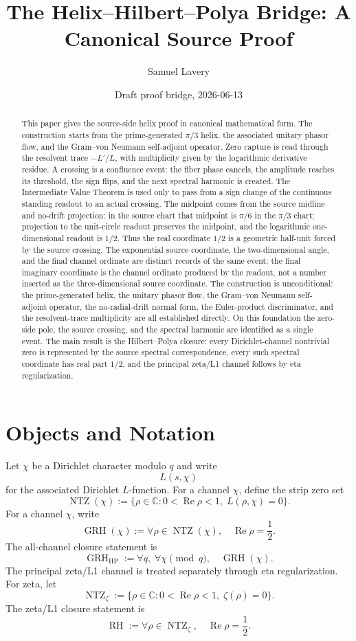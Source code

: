 \documentclass[11pt]{article}
\title{The Helix--Hilbert--Polya Bridge: A Canonical Source Proof}
\author{Samuel Lavery}
\date{Draft proof bridge, 2026-06-13}
\DeclareMathOperator{\Ree}{Re}
\DeclareMathOperator{\NTZ}{NTZ}
\DeclareMathOperator{\GRH}{GRH}
\DeclareMathOperator{\RH}{RH}
\begin{document}
\maketitle

\begin{abstract}
This paper gives the source-side helix proof in canonical mathematical form.  The
construction starts from the prime-generated $\pi/3$ helix, the associated unitary
phasor flow, and the Gram--von Neumann self-adjoint operator.  Zero capture is read
through the resolvent trace $-L'/L$, with multiplicity given by the logarithmic
derivative residue.  A crossing is a confluence event: the fiber phase cancels, the
amplitude reaches its threshold, the sign flips, and the next spectral harmonic is
created.  The Intermediate Value Theorem is used only to pass from a sign
change of the continuous standing readout to an actual crossing.  The midpoint
comes from the source midline and no-drift projection: in the source chart
that midpoint is $\pi/6$ in the $\pi/3$ chart;
projection to the unit-circle readout preserves the midpoint, and the logarithmic
one-dimensional readout is $1/2$.  Thus the real coordinate $1/2$ is a geometric
half-unit forced by the source crossing.  The exponential source coordinate,
the two-dimensional angle, and the final channel ordinate are distinct records
of the same event; the final imaginary coordinate is the channel ordinate
produced by the readout, not a number inserted as the three-dimensional source
coordinate.  The construction is
unconditional: the prime-generated helix, the unitary
phasor flow, the Gram--von Neumann self-adjoint operator, the no-radial-drift normal
form, the Euler-product discriminator, and the resolvent-trace multiplicity are all
established directly.  On this foundation the zero-side pole, the source crossing, and
the spectral harmonic are identified as a single event.  The main result is the
Hilbert--Polya closure: every Dirichlet-channel nontrivial zero is represented by the
source spectral correspondence, every such spectral coordinate has real part $1/2$,
and the principal zeta/L1 channel follows by eta regularization.
\end{abstract}

\tableofcontents

\section{Objects and Notation}

Let $\chi$ be a Dirichlet character modulo $q$ and write
\[
  L(s,\chi)
\]
for the associated Dirichlet $L$-function.  For a channel $\chi$, define the strip zero set
\[
  \NTZ(\chi)
  :=
  \{\rho\in\mathbb C : 0<\Ree\rho<1,\; L(\rho,\chi)=0\}.
\]
For a channel $\chi$, write
\[
  \GRH(\chi)
  :=
  \forall \rho\in\NTZ(\chi),\quad \Ree\rho=\frac12 .
\]
The all-channel closure statement is
\[
  \GRH_{\mathrm{HP}}
  :=
  \forall q,\;\forall\chi \pmod q,\quad \GRH(\chi).
\]
The principal zeta/L1 channel is treated separately through eta regularization.
For zeta, let
\[
  \NTZ_\zeta
  :=
  \{\rho\in\mathbb C : 0<\Ree\rho<1,\; \zeta(\rho)=0\}.
\]
The zeta/L1 closure statement is
\[
  \RH
  :=
  \forall \rho\in\NTZ_\zeta,\quad \Ree\rho=\frac12 .
\]
\end{document}
